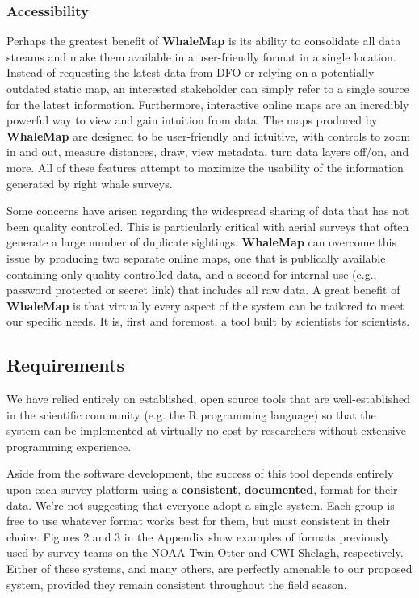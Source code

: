 \documentclass[11pt, letterpaper]{article}
\begin{document}
\subsubsection{Accessibility}

Perhaps the greatest benefit of \textbf{WhaleMap} is its ability to consolidate all data streams and make them available in a user-friendly format in a single location. Instead of requesting the latest data from DFO or relying on a potentially outdated static map, an interested stakeholder can simply refer to a single source for the latest information. Furthermore, interactive online maps are an incredibly powerful way to view and gain intuition from data. The maps produced by \textbf{WhaleMap} are designed to be user-friendly and intuitive, with controls to zoom in and out, measure distances, draw, view metadata, turn data layers off/on, and more. All of these features attempt to maximize the usability of the information generated by right whale surveys. 

Some concerns have arisen regarding the widespread sharing of data that has not been quality controlled. This is particularly critical with aerial surveys that often generate a large number of duplicate sightings. \textbf{WhaleMap} can overcome this issue by producing two separate online maps, one that is publically available containing only quality controlled data, and a second for internal use (e.g., password protected or secret link) that includes all raw data. A great benefit of \textbf{WhaleMap} is that virtually every aspect of the system can be tailored to meet our specific needs. It is, first and foremost, a tool built by scientists for scientists. 

\subsection{Requirements}

We have relied entirely on established, open source tools that are well-established in the scientific community (e.g. the R programming language) so that the system can be implemented at virtually no cost by researchers without extensive programming experience.

Aside from the software development, the success of this tool depends entirely upon each survey platform using a \textbf{consistent}, \textbf{documented}, format for their data. We're not suggesting that everyone adopt a single system. Each group is free to use whatever format works best for them, but must consistent in their choice. Figures 2 and 3 in the Appendix show examples of formats previously used by survey teams on the NOAA Twin Otter and CWI Shelagh, respectively. Either of these systems, and many others, are perfectly amenable to our proposed system, provided they remain consistent throughout the field season.
\end{document}
